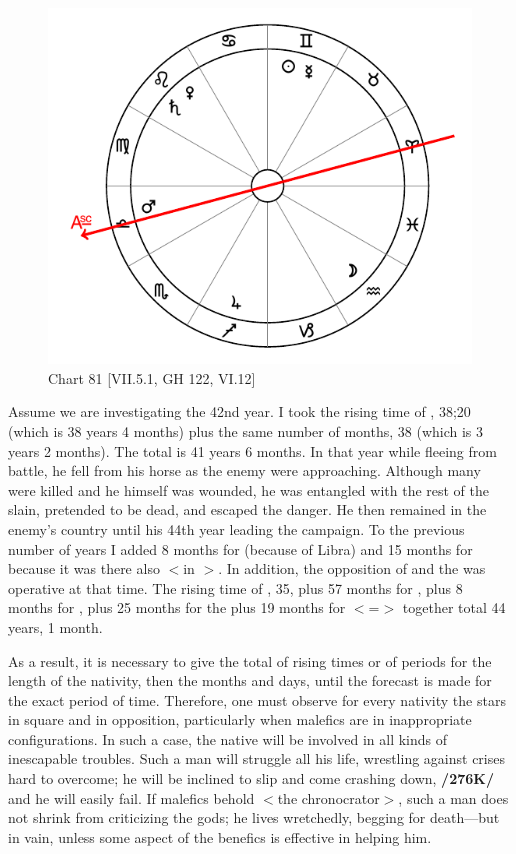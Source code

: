 \begin{figure}
\centering
\vspace{-10pt}
\includegraphics[width=.68\textwidth]{charts/7_5_1}
\caption{Chart 81 [VII.5.1, GH 122, VI.12]}
\label{fig:chart81}
\end{figure} 

Assume we are investigating the 42nd year. I took the rising time of \Libra, 38;20 (which is 38 years 4 months) plus the same number of months, 38 (which is 3 years 2 months). The total is 41 years 6 months. In that year while fleeing from battle, he fell from his horse as the enemy were approaching. Although many were killed and he himself was wounded, he was entangled with the rest of the slain, pretended to be dead, and escaped the danger. He then remained in the enemy’s country until his 44th year leading the campaign. To the previous number of years I added 8 months for \Venus\xspace (because of Libra) and 15 months for \Mars\xspace because it was there also $<$in \Libra$>$. In addition, the opposition of \Saturn\xspace and the \Moon\xspace was operative at that time. The rising time of \Leo, 35, plus 57 months for \Saturn, plus 8 months for \Venus, plus 25 months for the \Moon\xspace plus 19 months for \Leo\xspace $<$=\Sun$>$ together total 44 years, 1 month. 

As a result, it is necessary to give the total of rising times or of periods for the length of the nativity, then the months and days, until the forecast is made for the exact period of time. Therefore, one must observe for every nativity the stars in square and in opposition, particularly when malefics are in inappropriate configurations. In such a case, the native will be involved in all kinds of inescapable troubles. Such a man will struggle all his life, wrestling against crises hard to overcome; he will be inclined to slip and come crashing down, \textbf{/276K/} and he will easily fail. If malefics behold $<$the chronocrator$>$, such a man does not shrink from criticizing the gods; he lives wretchedly, begging for death—but in vain, unless some aspect of the benefics is effective in helping him. 

